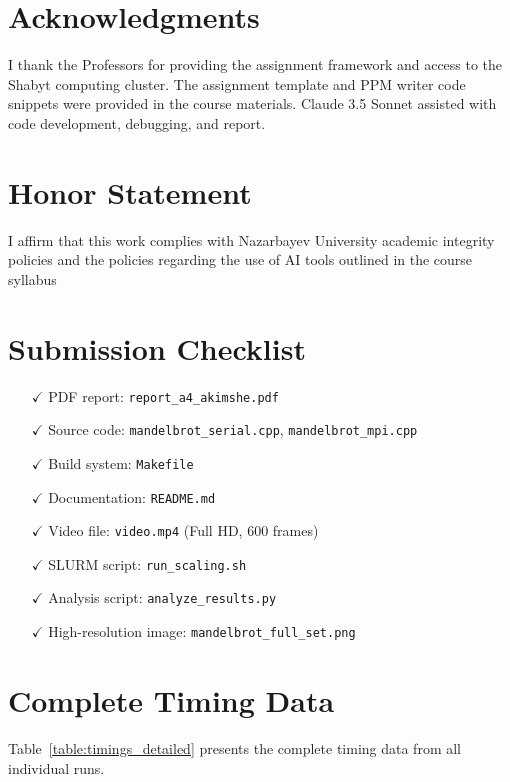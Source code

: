 \documentclass[11pt,a4paper]{article}
\newcommand{\honor}{I affirm that this work complies with Nazarbayev University academic integrity policies and the policies regarding the use of AI tools outlined in the course syllabus}
\begin{document}
	\section*{Acknowledgments}
	
	I thank the Professors for providing the assignment framework and access to the Shabyt computing cluster. The assignment template and PPM writer code snippets were provided in the course materials. Claude 3.5 Sonnet assisted with code development, debugging, and report.
	
	\section*{Honor Statement}
	\honor
	
	\section*{Submission Checklist}
	\begin{itemize}
		\item[$\checkmark$] PDF report: \texttt{report\_a4\_akimshe.pdf}
		\item[$\checkmark$] Source code: \texttt{mandelbrot\_serial.cpp}, \texttt{mandelbrot\_mpi.cpp}
		\item[$\checkmark$] Build system: \texttt{Makefile}
		\item[$\checkmark$] Documentation: \texttt{README.md}
		\item[$\checkmark$] Video file: \texttt{video.mp4} (Full HD, 600 frames)
		\item[$\checkmark$] SLURM script: \texttt{run\_scaling.sh}
		\item[$\checkmark$] Analysis script: \texttt{analyze\_results.py}
		\item[$\checkmark$] High-resolution image: \texttt{mandelbrot\_full\_set.png}
	\end{itemize}
	
	\appendix
	\section{Complete Timing Data}
	
	Table~\ref{table:timings_detailed} presents the complete timing data from all individual runs.
	
\end{document}
